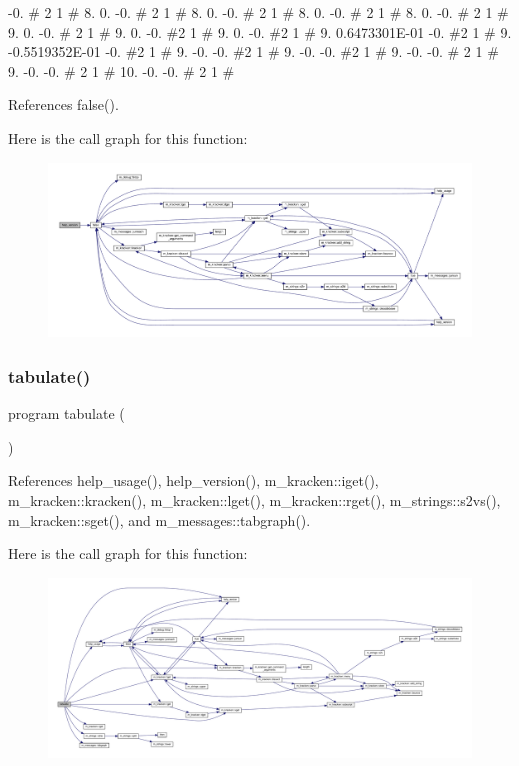 -\/0. \# 2 1 \# 8. 0. -\/0. \# 2 1 \# 8. 0. -\/0. \# 2 1 \# 8. 0. -\/0. \# 2 1 \# 8. 0. -\/0. \# 2 1 \# 9. 0. -\/0. \# 2 1 \# 9. 0. -\/0. \#2 1 \# 9. 0. -\/0. \#2 1 \# 9. 0.\+6473301E-\/01 -\/0. \#2 1 \# 9. -\/0.\+5519352E-\/01 -\/0. \#2 1 \# 9. -\/0. -\/0. \#2 1 \# 9. -\/0. -\/0. \#2 1 \# 9. -\/0. -\/0. \# 2 1 \# 9. -\/0. -\/0. \# 2 1 \# 10. -\/0. -\/0. \# 2 1 \# 

References false().

Here is the call graph for this function\+:
\nopagebreak
\begin{figure}[H]
\begin{center}
\leavevmode
\includegraphics[width=350pt]{tabulate_8f90_a39c21619b08a3c22f19e2306efd7f766_cgraph}
\end{center}
\end{figure}
\mbox{\label{tabulate_8f90_a013be6cecb71296773686ddf56ac1a34}} 
\subsubsection{\texorpdfstring{tabulate()}{tabulate()}}
{\footnotesize\ttfamily program tabulate (\begin{DoxyParamCaption}{ }\end{DoxyParamCaption})}



References help\+\_\+usage(), help\+\_\+version(), m\+\_\+kracken\+::iget(), m\+\_\+kracken\+::kracken(), m\+\_\+kracken\+::lget(), m\+\_\+kracken\+::rget(), m\+\_\+strings\+::s2vs(), m\+\_\+kracken\+::sget(), and m\+\_\+messages\+::tabgraph().

Here is the call graph for this function\+:
\nopagebreak
\begin{figure}[H]
\begin{center}
\leavevmode
\includegraphics[width=350pt]{tabulate_8f90_a013be6cecb71296773686ddf56ac1a34_cgraph}
\end{center}
\end{figure}
